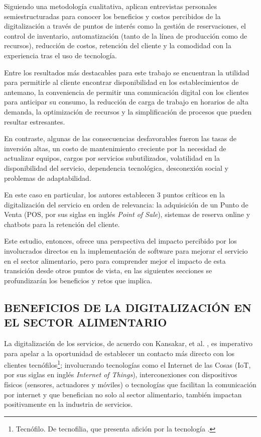 Siguiendo una metodología cualitativa, aplican entrevistas personales semiestructuradas para conocer los beneficios y costos percibidos de la digitalización a través de puntos de interés como la gestión de reservaciones, el control de inventario, automatización (tanto de la línea de producción como de recursos), reducción de costos, retención del cliente y la comodidad con la experiencia tras el uso de tecnología. 

Entre los resultados más destacables para este trabajo se encuentran la utilidad para permitirle al cliente encontrar disponibilidad en los establecimientos de antemano, la conveniencia de permitir una comunicación digital con los clientes para anticipar su consumo, la reducción de carga de trabajo en horarios de alta demanda, la optimización de recursos y la simplificación de procesos que pueden resultar estresantes. 

En contraste, algunas de las consecuencias desfavorables fueron las tasas de inversión altas, un costo de mantenimiento creciente por la necesidad de actualizar equipos, cargos por servicios subutilizados, volatilidad en la disponibilidad del servicio, dependencia tecnológica, desconexión social y problemas de adaptabilidad.  

En este caso en particular, los autores establecen 3 puntos críticos en la digitalización del servicio en orden de relevancia: la adquisición de un Punto de Venta (POS, por sus siglas en inglés \textit{Point of Sale}), sistemas de reserva online y chatbots para la retención del cliente.  

Este estudio, entonces, ofrece una perspectiva del impacto percibido por los involucrados directos en la implementación de software para mejorar el servicio en el sector alimentario, pero para comprender mejor el impacto de esta transición desde otros puntos de vista, en las siguientes secciones se profundizarán los beneficios y retos que implica.

\subsection{BENEFICIOS DE LA DIGITALIZACIÓN EN EL SECTOR ALIMENTARIO}

La digitalización de los servicios, de acuerdo con Kansakar, et al. \cite{kansakar2018technology}, es imperativo para apelar a la oportunidad de establecer un contacto más directo con los clientes tecnófilos\footnote{Tecnófilo. De tecnofilia, que presenta afición por la tecnología \cite{rae2024tecnofilia}.}; involucrando tecnologías como el Internet de las Cosas (IoT, por sus siglas en inglés \textit{Internet of Things}), interconexiones con dispositivos físicos (sensores, actuadores y móviles) o tecnologías que facilitan la comunicación por internet y que benefician no solo al sector alimentario, también impactan positivamente en la industria de servicios.  

